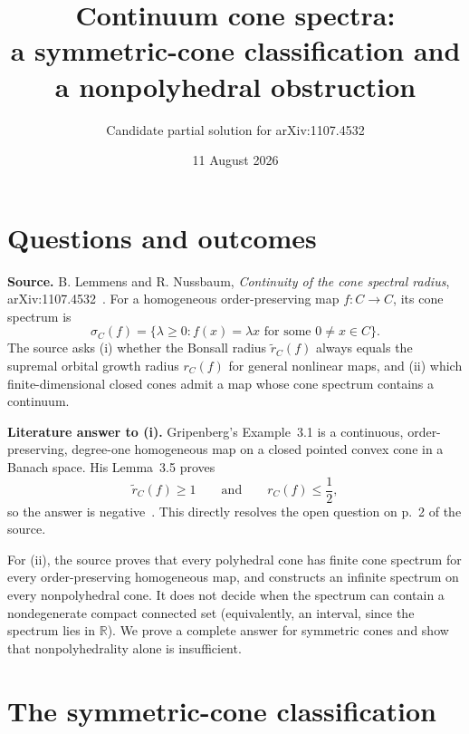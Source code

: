\documentclass[10pt]{article}
\title{Continuum cone spectra:\\a symmetric-cone classification and a nonpolyhedral obstruction}
\author{Candidate partial solution for arXiv:1107.4532}
\date{11 August 2026}
\newcommand{\R}{\mathbb R}
\begin{document}
\maketitle

\begin{center}
\end{center}

\section{Questions and outcomes}

\textbf{Source.} B. Lemmens and R. Nussbaum,
\emph{Continuity of the cone spectral radius}, arXiv:1107.4532~\cite{LN}.
For a homogeneous order-preserving map $f:C\to C$, its cone spectrum is
\[
 \sigma_C(f)=\{\lambda\geq0:f(x)=\lambda x\text{ for some }0\ne x\in C\}.
\]
The source asks (i) whether the Bonsall radius $\widetilde r_C(f)$ always
equals the supremal orbital growth radius $r_C(f)$ for general nonlinear
maps, and (ii) which finite-dimensional closed cones admit a map whose cone
spectrum contains a continuum.

\textbf{Literature answer to (i).} Gripenberg's Example~3.1 is a continuous,
order-preserving, degree-one homogeneous map on a closed pointed convex cone
in a Banach space.  His Lemma~3.5 proves
\[
 \widetilde r_C(f)\geq1\qquad\text{and}\qquad r_C(f)\leq\frac12,
\]
so the answer is negative~\cite{Gripenberg}.  This directly resolves the
open question on p.~2 of the source.

For (ii), the source proves that every polyhedral cone has finite cone
spectrum for every order-preserving homogeneous map, and constructs an
infinite spectrum on every nonpolyhedral cone.  It does not decide when the
spectrum can contain a nondegenerate compact connected set (equivalently, an
interval, since the spectrum lies in $\R$).  We prove a complete answer for
symmetric cones and show that nonpolyhedrality alone is insufficient.

\section{The symmetric-cone classification}
\end{document}
